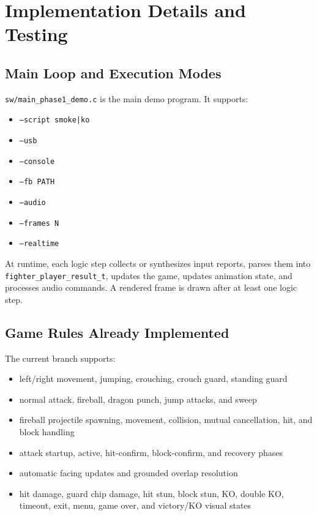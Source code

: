 \documentclass[12pt,a4paper]{article}
\begin{document}
\section{Implementation Details and Testing}

\subsection{Main Loop and Execution Modes}

\texttt{sw/main\_phase1\_demo.c} is the main demo program. It supports:

\begin{itemize}
  \item \texttt{--script smoke|ko}
  \item \texttt{--usb}
  \item \texttt{--console}
  \item \texttt{--fb PATH}
  \item \texttt{--audio}
  \item \texttt{--frames N}
  \item \texttt{--realtime}
\end{itemize}

At runtime, each logic step collects or synthesizes input reports, parses them
into \texttt{fighter\_player\_result\_t}, updates the game, updates animation
state, and processes audio commands. A rendered frame is drawn after at least
one logic step.

\subsection{Game Rules Already Implemented}

The current branch supports:

\begin{itemize}
  \item left/right movement, jumping, crouching, crouch guard, standing guard
  \item normal attack, fireball, dragon punch, jump attacks, and sweep
  \item fireball projectile spawning, movement, collision, mutual cancellation,
  hit, and block handling
  \item attack startup, active, hit-confirm, block-confirm, and recovery phases
  \item automatic facing updates and grounded overlap resolution
  \item hit damage, guard chip damage, hit stun, block stun, KO, double KO,
  timeout, exit, menu, game over, and victory/KO visual states
\end{itemize}
\end{document}
